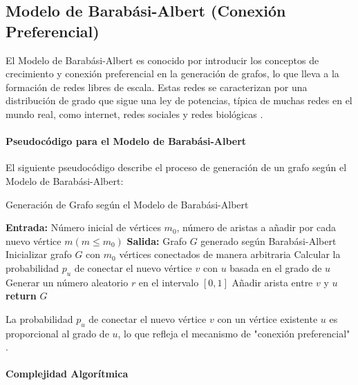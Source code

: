 \subsection{Modelo de Barabási-Albert (Conexión Preferencial)}

El Modelo de Barabási-Albert es conocido por introducir los conceptos de crecimiento y conexión preferencial en la generación de grafos, lo que lleva a la formación de redes libres de escala. Estas redes se caracterizan por una distribución de grado que sigue una ley de potencias, típica de muchas redes en el mundo real, como internet, redes sociales y redes biológicas \citep{Barabasi1999} .

\paragraph{Pseudocódigo para el Modelo de Barabási-Albert}

El siguiente pseudocódigo describe el proceso de generación de un grafo según el Modelo de Barabási-Albert:

\begin{algorithm}
\caption{Generación de Grafo según el Modelo de Barabási-Albert}
\begin{algorithmic}[1]
\State \textbf{Entrada:} Número inicial de vértices $m_0$, número de aristas a añadir por cada nuevo vértice $m (m \leq m_0)$
\State \textbf{Salida:} Grafo $G$ generado según Barabási-Albert
    \State Inicializar grafo $G$ con $m_0$ vértices conectados de manera arbitraria
            \State Calcular la probabilidad $p_u$ de conectar el nuevo vértice $v$ con $u$ basada en el grado de $u$
            \State Generar un número aleatorio $r$ en el intervalo $[0, 1]$
                \State Añadir arista entre $v$ y $u$
            \EndIf
        \EndFor
    \EndFor
    \State \textbf{return} $G$
\EndProcedure
\end{algorithmic}
\end{algorithm}

La probabilidad $p_u$ de conectar el nuevo vértice $v$ con un vértice existente $u$ es proporcional al grado de $u$, lo que refleja el mecanismo de "conexión preferencial" .

\paragraph{Complejidad Algorítmica}

